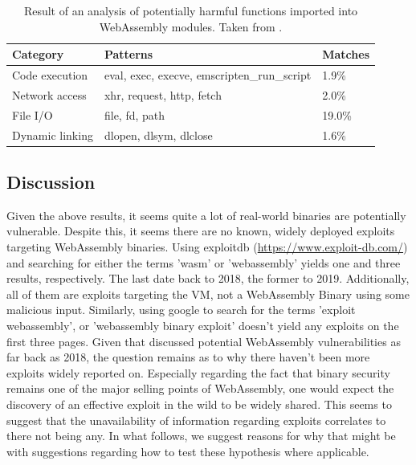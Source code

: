 \documentclass[sigconf]{acmart}
\begin{document}
\begin{table}
\label{table:analysis_import_harmful_functions}
\caption{Result of an analysis of potentially harmful functions imported into WebAssembly modules. Taken from \cite{hilbig_empirical_2021}.}
\begin{tabular}{l|l|l}
  \toprule
  Category & Patterns & Matches\\
  \midrule
  Code execution & eval, exec, execve, emscripten_run_script & 1.9\% \\ \hline
  Network access & xhr, request, http, fetch & 2.0\% \\ \hline
  File I/O  & file, fd, path & 19.0\% \\ \hline
  Dynamic linking & dlopen, dlsym, dlclose  & 1.6\% \\ \hline
  \bottomrule
\end{tabular}
\end{table}

\subsection{Discussion}
Given the above results, it seems quite a lot of real-world binaries are potentially vulnerable. Despite this, it seems there are no known, widely deployed exploits targeting WebAssembly binaries. Using exploitdb (\url{https://www.exploit-db.com/}) and searching for either the terms 'wasm' or 'webassembly' yields one and three results, respectively. The last date back to 2018, the former to 2019. Additionally, all of them are exploits targeting the VM, not a WebAssembly Binary using some malicious input. Similarly, using google to search for the terms 'exploit webassembly', or 'webassembly binary exploit' doesn't yield any exploits on the first three pages. Given that \cite{mcfadden_security_2018} discussed potential WebAssembly vulnerabilities as far back as 2018, the question remains as to why there haven't been more exploits widely reported on. Especially regarding the fact that binary security remains one of the major selling points of WebAssembly, one would expect the discovery of an effective exploit in the wild to be widely shared. This seems to suggest that the unavailability of information regarding exploits correlates to there not being any. In what follows, we suggest reasons for why that might be with suggestions regarding how to test these hypothesis where applicable.
\end{document}

